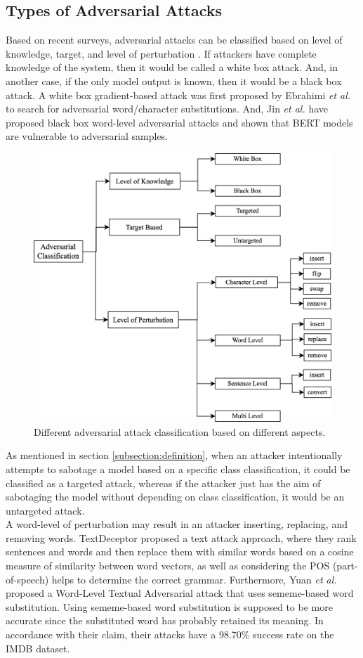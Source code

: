 \documentclass[%
	BCOR=8mm, %
	DIV=12,
	toc=bibliography, %
	toc=listof, %
	oneside, %
	egregdoesnotlikesansseriftitles, %
	]{scrbook}
\begin{document}
\subsection{Types of Adversarial Attacks}
\label{subsection:attacktypes}
Based on recent surveys, adversarial attacks can be classified based on level of knowledge, target, and level of perturbation \cite{huq_adversarial_2020,wang_towards_2021}. If attackers have complete knowledge of the system, then it would be called a  white box attack. And, in another case, if the only model output is known, then it would be a black box attack. A white box gradient-based attack was first proposed by Ebrahimi \textit{et al.} \cite{ebrahimi_hotflip_2018} to search for adversarial word/character substitutions. And, Jin \textit{et al.} \cite{jin_is_2020} have proposed black box word-level adversarial attacks and shown that BERT models are vulnerable to adversarial samples.\\
\begin{figure}[h!]
    \centering
    \includegraphics[width=0.65\linewidth]{img/attack_classification.png}
    \caption[Adversarial attacks classification diagram]{Different adversarial attack classification based on different aspects.}
    \label{fig:attack_classification}
\end{figure}
As mentioned in section \ref{subsection:definition}, when an attacker intentionally attempts to sabotage a model based on a specific class classification, it could be classified as a targeted attack, whereas if the attacker just has the aim of sabotaging the model without depending on class classification, it would be an untargeted attack.\\
A word-level of perturbation may result in an attacker inserting, replacing, and removing words. TextDeceptor \cite{saxena_textdecepter_2020} proposed a text attack approach, where they rank sentences and words and then replace them with similar words based on a cosine measure of similarity between word vectors, as well as considering the POS (part-of-speech) helps to determine the correct grammar. Furthermore, Yuan \textit{et al.} \cite{zang_word-level_2019} proposed a Word-Level Textual Adversarial attack that uses sememe-based word substitution. Using sememe-based word substitution is supposed to be more accurate since the substituted word has probably retained its meaning. In accordance with their claim, their attacks have a 98.70\% success rate on the IMDB dataset.\\
\end{document}
